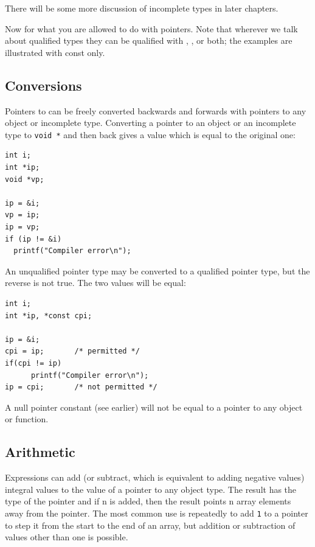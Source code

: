   There will be some more discussion of incomplete types in later
   chapters.


  Now for what you are allowed to do with pointers. Note that wherever we
   talk about qualified types they can be qualified with \const,
   \volatile, or both; the examples are illustrated with const
   only.


  \subsection{Conversions}
   

   Pointers to \void{} can be freely converted backwards and
    forwards with pointers to any object or incomplete type. Converting
    a pointer to an object or an incomplete type to \texttt{void *} and
    then back gives a value which is equal to the original one:


   \begin{Verbatim}
int i;
int *ip;
void *vp;

ip = &i;
vp = ip;
ip = vp;
if (ip != &i)
  printf("Compiler error\n");
\end{Verbatim}

   An unqualified pointer type may be converted to a qualified pointer
    type, but the reverse is not true. The two values will be equal:


   
   \begin{Verbatim}
int i;
int *ip, *const cpi;

ip = &i;
cpi = ip;       /* permitted */
if(cpi != ip)
      printf("Compiler error\n");
ip = cpi;       /* not permitted */
\end{Verbatim}

   A null pointer constant (see earlier) will not be equal to a pointer
    to any object or function.


  

  \subsection{Arithmetic}
   

   Expressions can add (or subtract, which is equivalent to adding
    negative values) integral values to the value of a pointer to any object
    type. The result has the type of the pointer and if n is
    added, then the result points n array elements away from the
    pointer. The most common use is repeatedly to add \texttt{1} to
    a pointer to step it from the start to the end of an array, but addition
    or subtraction of values other than one is possible.


